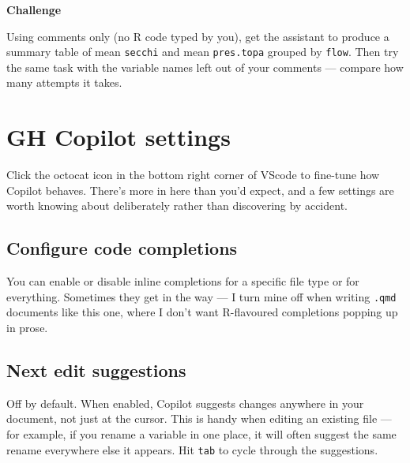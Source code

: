 \documentclass[
  letterpaper,
  DIV=11,
  numbers=noendperiod]{scrreprt}
\begin{document}
\begin{tcolorbox}[enhanced jigsaw, toprule=.15mm, rightrule=.15mm, left=2mm, leftrule=.75mm, breakable, opacityback=0, arc=.35mm, colframe=quarto-callout-important-color-frame, bottomrule=.15mm, colback=white]
\begin{minipage}[t]{5.5mm}
\textcolor{quarto-callout-important-color}{\faExclamation}
\end{minipage}%
\begin{minipage}[t]{\textwidth - 5.5mm}

\vspace{-3mm}\textbf{Challenge}\vspace{3mm}

Using comments only (no R code typed by you), get the assistant to
produce a summary table of mean \texttt{secchi} and mean
\texttt{pres.topa} grouped by \texttt{flow}. Then try the same task with
the variable names left out of your comments --- compare how many
attempts it takes.

\end{minipage}%
\end{tcolorbox}

\chapter{GH Copilot settings}\label{gh-copilot-settings}

Click the octocat icon in the bottom right corner of VScode to fine-tune
how Copilot behaves. There's more in here than you'd expect, and a few
settings are worth knowing about deliberately rather than discovering by
accident.

\section{Configure code completions}\label{configure-code-completions}

You can enable or disable inline completions for a specific file type or
for everything. Sometimes they get in the way --- I turn mine off when
writing \texttt{.qmd} documents like this one, where I don't want
R-flavoured completions popping up in prose.

\section{Next edit suggestions}\label{next-edit-suggestions}

Off by default. When enabled, Copilot suggests changes anywhere in your
document, not just at the cursor. This is handy when editing an existing
file --- for example, if you rename a variable in one place, it will
often suggest the same rename everywhere else it appears. Hit
\texttt{tab} to cycle through the suggestions.
\end{document}

